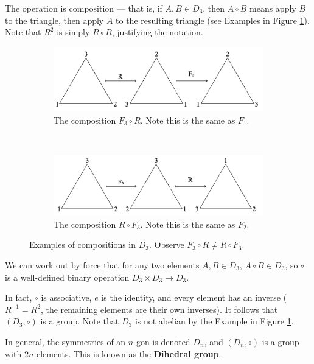 \documentclass{amsart}
\begin{document}
\begin{example}
	The operation is composition --- that is, if \(A, B\in D_3\), then \(A\circ
	B\) means apply \(B\) to the triangle, then apply \(A\) to the resulting
	triangle (see Examples in Figure	\ref{D3operations}). Note that \(R^2\) is
	simply \(R\circ R\), justifying the notation.
	\begin{figure}[!h]
		\centering
		\begin{subfigure}{.75\textwidth}
			\centering
			\includegraphics[width=.9\linewidth]{Inkscape Files/D3RF3.png}
			\caption{The composition \(F_3\circ R\). Note this is the same as
			\(F_1\).}
		\end{subfigure}%
		\\
		\begin{subfigure}{.77\textwidth}
			\centering
			\includegraphics[width=.9\linewidth]{Inkscape Files/D3F3R.png}
			\caption{The composition \(R\circ F_3\). Note this is the same as
			\(F_2\).}
		\end{subfigure}%
		\caption{Examples of compositions in \(D_3\). Observe \(F_3\circ R\ne
		R\circ F_3\).}
		\label{D3operations}
	\end{figure}
	We can work out by force that	for any two elements \(A, B\in D_3\), \(A\circ
	B\in D_3\), so \(\circ\) is a well-defined binary operation \(D_3\times
	D_3\to D_3\).

	In fact, \(\circ\) is associative, \(e\) is the identity, and every element
	has an inverse (\(R^{-1} = R^2\), the remaining elements are their own
	inverses). It follows that	\((D_3, \circ)\) is a group. Note that \(D_3\) is
	not abelian by the Example in Figure \ref{D3operations}.

	In general, the symmetries of an \(n\)-gon is denoted \(D_n\), and \((D_n,
	\circ)\) is a group with \(2n\) elements. This is known as the
	\textbf{Dihedral group}.
\end{example}
\end{document}
